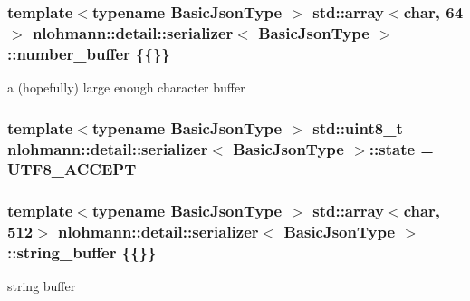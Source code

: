 \subsubsection[{\texorpdfstring{number\+\_\+buffer}{number_buffer}}]{\setlength{\rightskip}{0pt plus 5cm}template$<$typename Basic\+Json\+Type $>$ {\bf std\+::array}$<$char, 64$>$ {\bf nlohmann\+::detail\+::serializer}$<$ Basic\+Json\+Type $>$\+::number\+\_\+buffer \{\{\}\}}\hypertarget{classnlohmann_1_1detail_1_1serializer_a1a9d8b344a6cb47728a3519693ec03d1}{}\label{classnlohmann_1_1detail_1_1serializer_a1a9d8b344a6cb47728a3519693ec03d1}


a (hopefully) large enough character buffer 

\subsubsection[{\texorpdfstring{state}{state}}]{\setlength{\rightskip}{0pt plus 5cm}template$<$typename Basic\+Json\+Type $>$ std\+::uint8\+\_\+t {\bf nlohmann\+::detail\+::serializer}$<$ Basic\+Json\+Type $>$\+::state = {\bf U\+T\+F8\+\_\+\+A\+C\+C\+E\+PT}}\hypertarget{classnlohmann_1_1detail_1_1serializer_a39b0975f219b542d7ca633652e925b4c}{}\label{classnlohmann_1_1detail_1_1serializer_a39b0975f219b542d7ca633652e925b4c}
\subsubsection[{\texorpdfstring{string\+\_\+buffer}{string_buffer}}]{\setlength{\rightskip}{0pt plus 5cm}template$<$typename Basic\+Json\+Type $>$ {\bf std\+::array}$<$char, 512$>$ {\bf nlohmann\+::detail\+::serializer}$<$ Basic\+Json\+Type $>$\+::string\+\_\+buffer \{\{\}\}}\hypertarget{classnlohmann_1_1detail_1_1serializer_a9c9b7ca63a66e59e5e7ffe8a2acf5c8f}{}\label{classnlohmann_1_1detail_1_1serializer_a9c9b7ca63a66e59e5e7ffe8a2acf5c8f}


string buffer 

